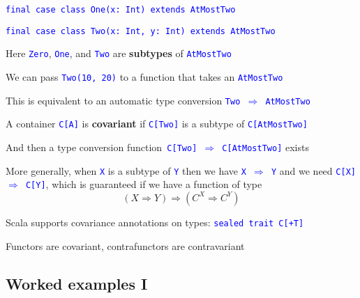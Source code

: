 \texttt{\textcolor{blue}{\footnotesize{}final case class One(x: Int)
extends AtMostTwo}}{\footnotesize\par}

\texttt{\textcolor{blue}{\footnotesize{}final case class Two(x: Int,
y: Int) extends AtMostTwo}}{\footnotesize\par}

Here \texttt{\textcolor{blue}{\footnotesize{}Zero}}, \texttt{\textcolor{blue}{\footnotesize{}One}},
and \texttt{\textcolor{blue}{\footnotesize{}Two}} are \textbf{subtypes}
of \texttt{\textcolor{blue}{\footnotesize{}AtMostTwo}}{\footnotesize\par}

We can pass \texttt{\textcolor{blue}{\footnotesize{}Two(10, 20)}}
to a function that takes an \texttt{\textcolor{blue}{\footnotesize{}AtMostTwo}}{\footnotesize\par}

This is equivalent to an automatic type conversion \texttt{\textcolor{blue}{\footnotesize{}Two
$\Rightarrow$ AtMostTwo}}{\footnotesize\par}

A container \texttt{\textcolor{blue}{\footnotesize{}C{[}A{]}}} is
\textbf{covariant} if \texttt{\textcolor{blue}{\footnotesize{}C{[}Two{]}}}
is a subtype of \texttt{\textcolor{blue}{\footnotesize{}C{[}AtMostTwo{]}}}{\footnotesize\par}

And then a type conversion function\texttt{\textcolor{blue}{\footnotesize{}
C{[}Two{]} $\Rightarrow$ C{[}AtMostTwo{]}}} exists

More generally, when \texttt{\textcolor{blue}{\footnotesize{}X}} is
a subtype of \texttt{\textcolor{blue}{\footnotesize{}Y}} then we have
\texttt{\textcolor{blue}{\footnotesize{}X $\Rightarrow$ Y}} and we
need \texttt{\textcolor{blue}{\footnotesize{}C{[}X{]} $\Rightarrow$
C{[}Y{]}}}, which is guaranteed if we have a function of type
\[
\left(X\Rightarrow Y\right)\Rightarrow(C^{X}\Rightarrow C^{Y})
\]

Scala supports covariance annotations on types: \texttt{\textcolor{blue}{\footnotesize{}sealed
trait C{[}+T{]}}}{\footnotesize\par}

Functors are covariant, contrafunctors are contravariant


\subsection{Worked examples I}

